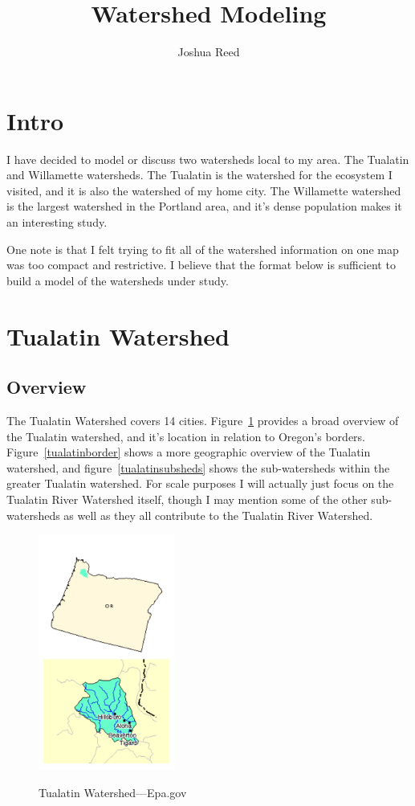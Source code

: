 \documentclass{article}
\author{Joshua Reed}
\title{Watershed Modeling}
\begin{document}
\maketitle{}
\section{Intro}
I have decided to model or discuss two watersheds local to my area. The Tualatin and Willamette watersheds. The Tualatin is the watershed 
for the ecosystem I visited, and it is also the watershed of my home city. The Willamette watershed is the largest watershed in the Portland area, and it's 
dense population makes it an interesting study.

One note is that I felt trying to fit all of the watershed information on one map was too compact and restrictive. I believe that the format below is sufficient
to build a model of the watersheds under study.

\section{Tualatin Watershed}\label{junk}
\subsection{Overview}
The Tualatin Watershed covers 14 cities. Figure~\ref{tualatinoverview} provides a broad overview of the Tualatin watershed, and it's location in relation to Oregon's 
borders. Figure~\ref{tualatinborder} shows a more geographic overview of the Tualatin watershed, and figure~\ref{tualatinsubsheds} shows the sub-watersheds within
the greater Tualatin watershed. For scale purposes I will actually just focus on the Tualatin River Watershed itself, though
I may mention some of the other sub-watersheds as well as they all contribute to the Tualatin River Watershed.

\begin{figure}[H]
\centering{}
\caption{Tualatin Watershed---Epa.gov}
\includegraphics[width=4.5cm]{TualatinWatershedBroadView}
\label{tualatinoverview}
\end{figure}
\end{document}
